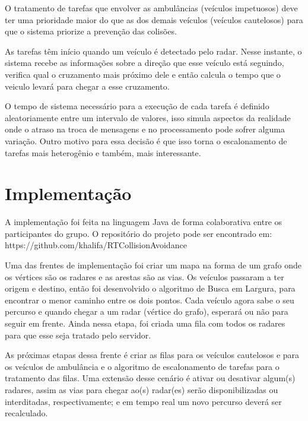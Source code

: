 O tratamento de tarefas que envolver as ambulâncias (veículos impetuosos) deve ter uma prioridade maior do que as dos demais veículos (veículos cautelosos) para que o sistema priorize a prevenção das colisões.

As tarefas têm início quando um veículo é detectado pelo radar. Nesse instante, o sistema recebe as informações sobre a direção que esse veículo está seguindo, verifica qual o cruzamento mais próximo dele e então calcula o tempo que o veiculo levará para chegar a esse cruzamento.

O tempo de sistema necessário para a execução de cada tarefa é definido aleatoriamente entre um intervalo de valores, isso simula aspectos da realidade onde o atraso na troca de mensagens e no processamento pode sofrer alguma variação. Outro motivo para essa decisão é que isso torna o escalonamento de tarefas mais heterogênio e também, mais interessante.

\section{Implementação}


A implementação foi feita na linguagem Java de forma colaborativa entre os participantes do grupo. O repositório do projeto pode ser encontrado em:
https://github.com/khalifa/RTCollisionAvoidance

Uma das frentes de implementação foi criar um mapa na forma de um grafo onde os vértices são os radares e as arestas são as vias. Os veículos passaram a ter origem e destino, então foi desenvolvido o algoritmo de Busca em Largura, para encontrar o menor caminho entre os dois pontos. Cada veículo agora sabe o seu percurso e quando chegar a um radar (vértice do grafo), esperará ou não para seguir em frente.
Ainda nessa etapa, foi criada uma fila com todos os radares para que esse seja tratado pelo servidor.

As próximas etapas dessa frente é criar as filas para os veículos cautelosos e para os veículos de ambulância e o algoritmo de escalonamento de tarefas para o tratamento das filas. Uma extensão desse cenário é ativar ou desativar algum(s) radares, assim as vias para chegar ao(s) radar(es) serão disponibilizadas ou interditadas, respectivamente; e em tempo real um novo percurso deverá ser recalculado.

